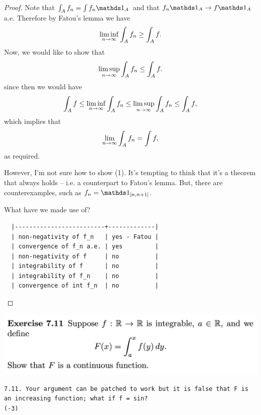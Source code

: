 \begin{proof}
  Note that $\int_A f_n = \int f_n\ind_A$ and that $f_n\ind_A \to f\ind_A$ a.e. Therefore by Fatou's lemma we have
  \begin{align*}
    \liminfn \int_A f_n \geq \int_A f.
  \end{align*}
  Now, we would like to show that
  \begin{align}
    \limsupn \int_A f_n \leq \int_A f.
  \end{align}
  since then we would have
  \begin{align*}
    \int_A f \leq \liminfn \int_A f_n \leq \limsupn \int_A f_n \leq \int_A f,
  \end{align*}
  which implies that
  \begin{align*}
    \limn \int_A f_n = \int f,
  \end{align*}
  as required.

  However, I'm not sure how to show (1). It's tempting to think that it's a theorem that always holds -- i.e. a
  counterpart to Fatou's lemma. But, there are counterexamples, such as $f_n = \ind_{[n, n+1]}$.

  What have we made use of?
\begin{verbatim}
  |-------------------------+-------------|
  | non-negativity of f_n   | yes - Fatou |
  | convergence of f_n a.e. | yes         |
  | non-negativity of f     | no          |
  | integrability of f      | no          |
  | integrability of f_n    | no          |
  | convergence of int f_n  | no          |
\end{verbatim}
\end{proof}


\newpage
\begin{mdframed}
\includegraphics[width=400pt]{img/analysis--berkeley-202a-hw08-d0c0.png}
\end{mdframed}

\begin{verbatim}
7.11. Your argument can be patched to work but it is false that F is an increasing function; what if f = sin?
(-3)
\end{verbatim}

